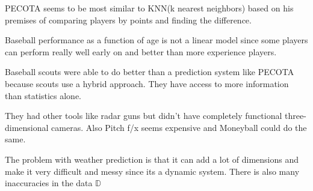 \documentclass[12pt]{article}
\begin{document}

\begin{enumerate}


PECOTA seems to be most similar to KNN(k nearest neighbors) based on his premises of comparing players by points and finding the difference. 


Baseball performance as a function of age is not a linear model since some players can perform really well early on and better than more experience players. 


Baseball scouts were able to do better than a prediction system like PECOTA because scouts use a hybrid approach. They have access to more information than statistics alone. 


They had other tools like radar guns but didn't have completely functional three- dimensional cameras. Also Pitch f/x seems expensive and Moneyball could do the same. 


The problem with weather prediction is that it can add a lot of dimensions and make it very difficult and messy since its a dynamic system. There is also many inaccuracies in the data $\mathbb{D}$




\end{enumerate}
\end{document}
